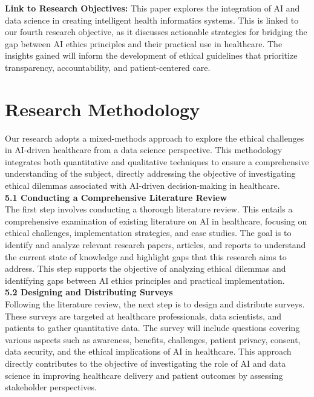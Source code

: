 \documentclass[a4paper, 12pt]{article}
\begin{document}
\textbf{Link to Research Objectives:} This paper explores the integration of AI and data science in creating intelligent health informatics systems. This is linked to our fourth research objective, as it discusses actionable strategies for bridging the gap between AI ethics principles and their practical use in healthcare. The insights gained will inform the development of ethical guidelines that prioritize transparency, accountability, and patient-centered care.
\pagebreak


\section{Research Methodology}
Our research adopts a mixed-methods approach to explore the ethical challenges in AI-driven healthcare from a data science perspective. This methodology integrates both quantitative and qualitative techniques to ensure a comprehensive understanding of the subject, directly addressing the objective of investigating ethical dilemmas associated with AI-driven decision-making in healthcare.\\

\textbf{5.1 \hspace{5mm} Conducting a Comprehensive Literature Review}\\
The first step involves conducting a thorough literature review. This entails a comprehensive examination of existing literature on AI in healthcare, focusing on ethical challenges, implementation strategies, and case studies. The goal is to identify and analyze relevant research papers, articles, and reports to understand the current state of knowledge and highlight gaps that this research aims to address. This step supports the objective of analyzing ethical dilemmas and identifying gaps between AI ethics principles and practical implementation.\\

\textbf{5.2 \hspace{5mm} Designing and Distributing Surveys}\\
Following the literature review, the next step is to design and distribute surveys. These surveys are targeted at healthcare professionals, data scientists, and patients to gather quantitative data. The survey will include questions covering various aspects such as awareness, benefits, challenges, patient privacy, consent, data security, and the ethical implications of AI in healthcare. This approach directly contributes to the objective of investigating the role of AI and data science in improving healthcare delivery and patient outcomes by assessing stakeholder perspectives.\\
\end{document}
